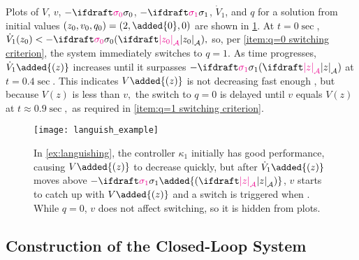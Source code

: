 \begin{example}
    Plots of $V$, $v$, $-\sigmazero$, $-\sigmaone$, $\dot V_1$, 
    and $q$ for a solution from initial values
    ${(z_0, v_0, q_0) = (2, \added{0}, 0)}$  
    are shown in \cref{fig:languishing example}.
    At $t = 0 \sec$, $\dot V_1(z_0) < -\sigmazero(\distA{z_0}),$ 
    so, 
    per \ref{item:q=0 switching criterion},
    the system immediately switches to $q=1.$
    As time progresses, $\dot V_1\added{(z)}$ increases until 
    it surpasses $-\sigmaone(\distA{z})$
    at $t = 0.4 \sec$.
    This indicates $V\added{(z)}$ is not decreasing fast enough , 
    but because $V(z)$ is less than $v,$
    the switch to $q = 0$ is delayed until $v$ equals $V(z)$ 
    at $t \approx 0.9 \sec,$
    as required in \ref{item:q=1 switching criterion}.%
    \begin{figure}[htbp]
        \centering
        \texttt{[image: languish\_example]}
        \setlength{\belowcaptionskip}{-12pt}
        \caption{In \cref{ex:languishing},
        the controller $\kappa_1$ initially has good performance, 
        causing $V\added{(z)}$ to decrease quickly, but after 
        $\dot V_1\added{(z)}$ moves above $-\sigmaone\added{(\distA{z})}$,
        $v$ starts to catch up with $V\added{(z)}$ and a switch is 
        triggered when . 
        While $q = 0$, $v$ does not affect switching, so it is hidden from plots.}
        \label{fig:languishing example}
    \end{figure}
\end{example}

        \subsection{Construction of the Closed-Loop System}        
\label{sec:construction of system}

